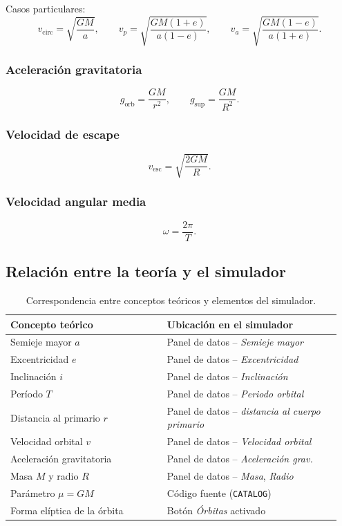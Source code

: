\documentclass[11pt,a4paper]{article}
\theoremstyle{definition}
\newcommand{\velesc}{\ensuremath{v_{\text{esc}}}}
\begin{document}
Casos particulares:
\[
  v_{\text{circ}} = \sqrt{\frac{GM}{a}}, \qquad
  v_{p} = \sqrt{\frac{GM(1+e)}{a(1-e)}}, \qquad
  v_{a} = \sqrt{\frac{GM(1-e)}{a(1+e)}}.
\]

\subsubsection*{Aceleración gravitatoria}

\[
  g_{\text{orb}} = \frac{GM}{r^{2}}, \qquad
  g_{\text{sup}} = \frac{GM}{R^{2}}.
\]

\subsubsection*{Velocidad de escape}

\[
  \velesc = \sqrt{\frac{2GM}{R}}.
\]

\subsubsection*{Velocidad angular media}

\[
  \omega = \frac{2\pi}{T}.
\]

\subsection{Relación entre la teoría y el simulador}

\begin{table}[h]
\centering
\caption{Correspondencia entre conceptos teóricos y elementos del simulador.}
\label{tab:correspondencia}
\begin{tabular}{@{}p{0.45\linewidth}p{0.5\linewidth}@{}}
\toprule
\textbf{Concepto teórico} & \textbf{Ubicación en el simulador} \\
\midrule
Semieje mayor $a$ & Panel de datos -- \emph{Semieje mayor} \\
Excentricidad $e$ & Panel de datos -- \emph{Excentricidad} \\
Inclinación $i$ & Panel de datos -- \emph{Inclinación} \\
Período $T$ & Panel de datos -- \emph{Periodo orbital} \\
Distancia al primario $r$ & Panel de datos -- \emph{distancia al cuerpo primario} \\
Velocidad orbital $v$ & Panel de datos -- \emph{Velocidad orbital} \\
Aceleración gravitatoria & Panel de datos -- \emph{Aceleración grav.} \\
Masa $M$ y radio $R$ & Panel de datos -- \emph{Masa}, \emph{Radio} \\
Parámetro $\mu = GM$ & Código fuente (\texttt{CATALOG}) \\
Forma elíptica de la órbita & Botón \emph{Órbitas} activado \\
\bottomrule
\end{tabular}
\end{table}
\end{document}
